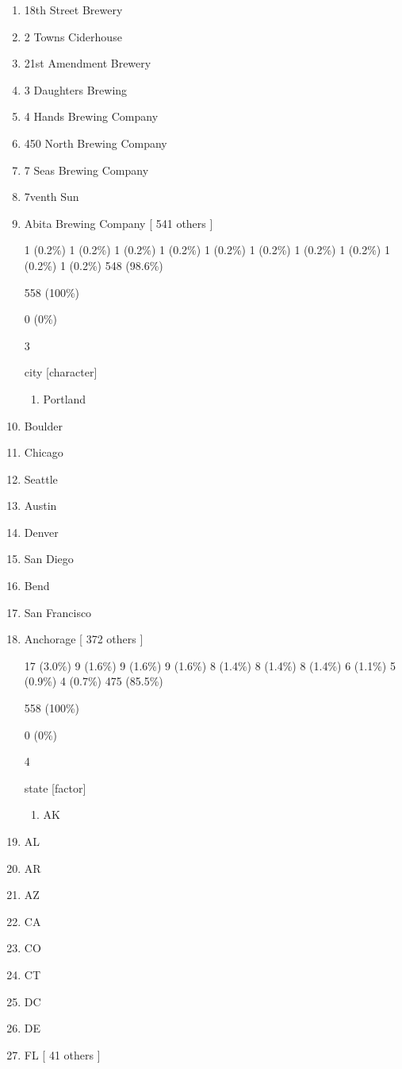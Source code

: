 \documentclass[]{article}
\providecommand{\tightlist}{%
  \setlength{\itemsep}{0pt}\setlength{\parskip}{0pt}}
\begin{document}
\begin{enumerate}
\def\labelenumi{\arabic{enumi}.}
\setcounter{enumi}{1}
\tightlist
\item
  18th Street Brewery
\item
  2 Towns Ciderhouse
\item
  21st Amendment Brewery
\item
  3 Daughters Brewing
\item
  4 Hands Brewing Company
\item
  450 North Brewing Company
\item
  7 Seas Brewing Company
\item
  7venth Sun
\item
  Abita Brewing Company {[} 541 others {]}

  1 (0.2\%) 1 (0.2\%) 1 (0.2\%) 1 (0.2\%) 1 (0.2\%) 1 (0.2\%) 1 (0.2\%)
  1 (0.2\%) 1 (0.2\%) 1 (0.2\%) 548 (98.6\%)

  558 (100\%)

  0 (0\%)

  3

  city {[}character{]}

  \begin{enumerate}
  \def\labelenumii{\arabic{enumii}.}
  \tightlist
  \item
    Portland
  \end{enumerate}
\item
  Boulder
\item
  Chicago
\item
  Seattle
\item
  Austin
\item
  Denver
\item
  San Diego
\item
  Bend
\item
  San Francisco
\item
  Anchorage {[} 372 others {]}

  17 (3.0\%) 9 (1.6\%) 9 (1.6\%) 9 (1.6\%) 8 (1.4\%) 8 (1.4\%) 8 (1.4\%)
  6 (1.1\%) 5 (0.9\%) 4 (0.7\%) 475 (85.5\%)

  558 (100\%)

  0 (0\%)

  4

  state {[}factor{]}

  \begin{enumerate}
  \def\labelenumii{\arabic{enumii}.}
  \tightlist
  \item
    AK
  \end{enumerate}
\item
  AL
\item
  AR
\item
  AZ
\item
  CA
\item
  CO
\item
  CT
\item
  DC
\item
  DE
\item
  FL {[} 41 others {]}


\end{enumerate}
\end{document}
